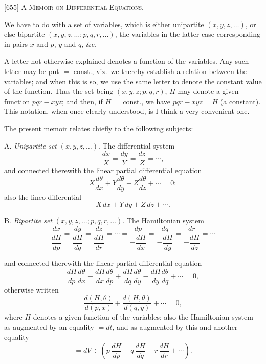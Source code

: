 \documentclass[11pt,a4paper]{article}
\begin{document}
\newpage


\begin{center}
\textsc{[655] A Memoir on Differential Equations.}
\end{center}

\medskip


\medskip

We have to do with a set of variables, which is either unipartite $(x, y, z, \ldots)$, or else bipartite $(x, y, z, \ldots; p, q, r, \ldots)$, the variables in the latter case corresponding in pairs $x$ and $p$, $y$ and $q$, \&c.

A letter not otherwise explained denotes a function of the variables. Any such letter may be put $=$ const., viz.\ we thereby establish a relation between the variables; and when this is so, we use the same letter to denote the constant value of the function. Thus the set being $(x, y, z; p, q, r)$, $H$ may denote a given function $pqr - xyz$; and then, if $H = $ const., we have $pqr - xyz = H$ (a constant). This notation, when once clearly understood, is I think a very convenient one.

The present memoir relates chiefly to the following subjects:

\medskip

\noindent A. \emph{Unipartite set} $(x, y, z, \ldots)$. The differential system
\[
\frac{dx}{X} = \frac{dy}{Y} = \frac{dz}{Z} = \cdots,
\]
and connected therewith the linear partial differential equation
\[
X\frac{d\theta}{dx} + Y\frac{d\theta}{dy} + Z\frac{d\theta}{dz} + \cdots = 0:
\]
also the lineo-differential
\[
X\,dx + Y\,dy + Z\,dz + \cdots.
\]

\noindent B. \emph{Bipartite set} $(x, y, z, \ldots; p, q, r, \ldots)$. The Hamiltonian system
\[
\frac{dx}{\dfrac{dH}{dp}} = \frac{dy}{\dfrac{dH}{dq}} = \frac{dz}{\dfrac{dH}{dr}} = \cdots = \frac{dp}{-\dfrac{dH}{dx}} = \frac{dq}{-\dfrac{dH}{dy}} = \frac{dr}{-\dfrac{dH}{dz}} = \cdots
\]

\newpage


and connected therewith the linear partial differential equation
\[
\frac{dH}{dp}\frac{d\theta}{dx} - \frac{dH}{dx}\frac{d\theta}{dp} + \frac{dH}{dq}\frac{d\theta}{dy} - \frac{dH}{dy}\frac{d\theta}{dq} + \cdots = 0,
\]
otherwise written
\[
\frac{d(H, \theta)}{d(p, x)} + \frac{d(H, \theta)}{d(q, y)} + \cdots = 0,
\]
where $H$ denotes a given function of the variables: also the Hamiltonian system as augmented by an equality $= dt$, and as augmented by this and another equality
\[
= dV \div \left(p\,\frac{dH}{dp} + q\,\frac{dH}{dq} + r\,\frac{dH}{dr} + \cdots\right).
\]
\end{document}

